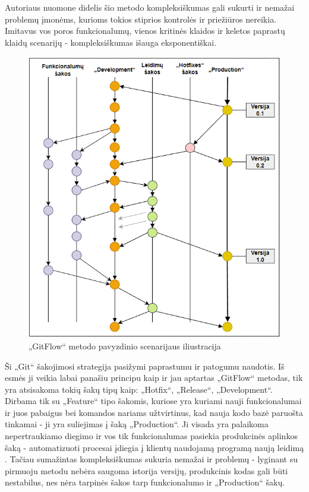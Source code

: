\documentclass{VUMIFPSkursinis}
\begin{document}
Autoriaus nuomone didelis šio metodo kompleksiškumas gali sukurti ir nemažai problemų įmonėms, kurioms tokios stiprios kontrolės ir priežiūros nereikia. Imitavus vos poros funkcionalumų, vienos kritinės klaidos ir keletos paprastų klaidų scenarijų - kompleksiškumas išauga eksponentiškai.

\begin{figure}[H]
    \centering
    \includegraphics[scale=0.6]{img/GitFlowBold.png}
    \caption{„GitFlow“ metodo pavyzdinio scenarijaus iliustracija}
    \label{img:mlp}
\end{figure}


Ši „Git“ šakojimosi strategija pasižymi paprastumu ir patogumu naudotis. Iš esmės ji veikia labai panašiu principu kaip ir jau aptartas „GitFlow“ metodas, tik yra atsisakoma tokių šakų tipų kaip: „Hotfix“, „Release“, „Development“. Dirbama tik su „Feature“ tipo šakomis, kuriose yra kuriami nauji funkcionalumai ir juos pabaigus bei komandos nariams užtvirtinus, kad nauja kodo bazė paruošta tinkamai - ji yra suliejimas į šaką „Production“. Ji visada yra palaikoma nepertraukiamo diegimo ir vos tik funkcionalumas pasiekia produkcinės aplinkos šaką - automatizuoti procesai įdiegia į klientų naudojamą programą naują leidimą \cite{SaltDevintas}. Tačiau sumažintas kompleksiškumas sukuria nemažai ir problemų - lyginant su pirmuoju metodu nebėra saugoma istorija versijų, produkcinis kodas gali būti nestabilus, nes nėra tarpinės šakos tarp funkcionalumo ir „Production“ šakų.
\end{document}
